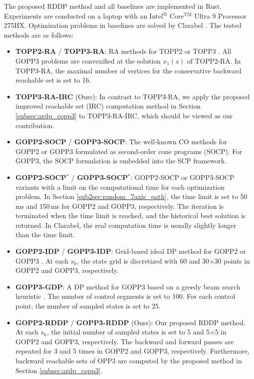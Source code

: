 \documentclass[journal]{IEEEtran}
\theoremstyle{definition}
\theoremstyle{definition}
\begin{document}
The proposed RDDP method and all baselines are implemented in Rust. Experiments are conducted on a laptop with an Intel${}^\text{\textregistered}$ Core${}^\text{TM}$ Ultra 9 Processor 275HX. Optimization problems in baselines are solved by Clarabel \cite{goulart2024clarabel}. The tested methods are as follows:
\begin{itemize}
    \item \textbf{TOPP2-RA} / \textbf{TOPP3-RA}: RA methods for TOPP2 \cite{pham2018new} or TOPP3 \cite{dio2025time}. All GOPP3 problems are convexified at the solution $x_1(s)$ of TOPP2-RA. In TOPP3-RA, the maximal number of vertices for the conservative backward reachable set is set to 16.
    \item \textbf{TOPP3-RA-IRC} (Ours): In contrast to TOPP3-RA, we apply the proposed improved reachable set (IRC) computation method in Section \ref{subsec:ardp_copp3} to TOPP3-RA-IRC, which should be viewed as our contribution.
    \item \textbf{GOPP2-SOCP} / \textbf{GOPP3-SOCP}: The well-known CO methods for GOPP2 \cite{verscheure2009time} or GOPP3 \cite{debrouwere2013time} formulated as second-order cone programs (SOCP). For GOPP3, the SOCP formulation is embedded into the SCP framework.
    \item \textbf{GOPP2-SOCP${}^*$} / \textbf{GOPP3-SOCP${}^*$}: GOPP2-SOCP or GOPP3-SOCP variants with a limit on the computational time for each optimization problem. In Section \ref{sub2sec:random_7axis_path}, the time limit is set to 50\,ms and 150\,ms for GOPP2 and GOPP3, respectively. The iteration is terminated when the time limit is reached, and the historical best solution is returned. In Clarabel, the real computation time is usually slightly longer than the time limit.
    \item \textbf{GOPP2-IDP} / \textbf{GOPP3-IDP}: Grid-based ideal DP method for GOPP2 or GOPP3 \cite{shin1986dynamic}. At each $s_k$, the state grid is discretized with 60 and 30$\times$30 points in GOPP2 and GOPP3, respectively.
    \item \textbf{GOPP3-GDP}: A DP method for GOPP3 based on a greedy beam search heuristic \cite{kaserer2019nearly}. The number of control segments is set to 100. For each control point, the number of sampled states is set to 25.
    \item \textbf{GOPP2-RDDP} / \textbf{GOPP3-RDDP} (Ours): Our proposed RDDP method. At each $s_k$, the initial number of sampled states is set to 5 and 5$\times$5 in GOPP2 and GOPP3, respectively. The backward and forward passes are repeated for 3 and 5 times in GOPP2 and GOPP3, respectively. Furthermore, backward reachable sets of OPP3 are computed by the proposed method in Section \ref{subsec:ardp_copp3}.
\end{itemize}
\end{document}
